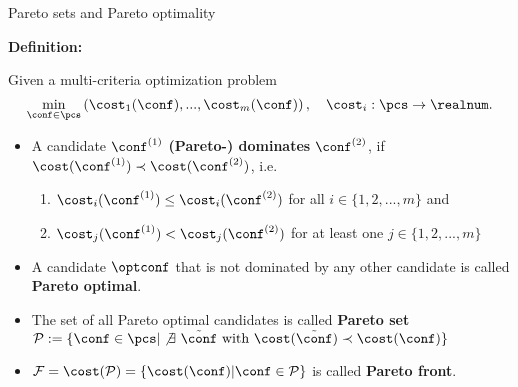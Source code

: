 \begin{frame}{Pareto sets and Pareto optimality}

\textbf{Definition:}

Given a multi-criteria optimization problem
    $$\min_{\conf \in \pcs} \left(\cost_1(\conf), ..., \cost_m(\conf)\right), \quad \cost_i: \pcs \to \realnum.$$

\begin{itemize}
    \item A candidate $\conf^{(1)}$ \textbf{(Pareto-) dominates} $\conf^{(2)}$, if $\cost(\conf^{(1)}) \prec \cost(\conf^{(2)})$, i.e.
\begin{enumerate}
    \item $\cost_i(\conf^{(1)}) \le \cost_i(\conf^{(2)})$ for all $i \in \{1, 2, ..., m\}$ and
    \item $\cost_j(\conf^{(1)}) < \cost_j(\conf^{(2)})$ for at least one $j \in \{1, 2, ..., m\}$
\end{enumerate}
\vspace*{0.1cm}
\item A candidate $\optconf$ that is not dominated by any other candidate is called \textbf{Pareto optimal}.
\vspace*{0.1cm}
\item The set of all Pareto optimal candidates is called \textbf{Pareto set} $\mathcal{P} := \{\conf \in \pcs |\not \exists ~\tilde{\conf} \text{ with } \cost(\tilde{\conf}) \prec \cost(\conf)\}$
\item $\mathcal{F} = \cost(\mathcal{P}) = \{\cost(\conf) | \conf \in \mathcal{P}\}$ is called \textbf{Pareto front}.
\end{itemize}

\end{frame}


